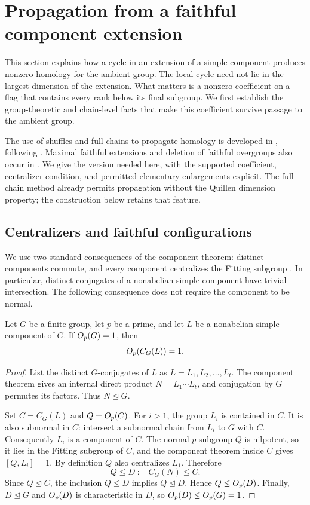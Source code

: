 \section{Propagation from a faithful component extension}
\label{sec:propagation}

This section explains how a cycle in an extension of a simple component
produces nonzero homology for the ambient group.  The local cycle need not
lie in the largest dimension of the extension.  What matters is a nonzero
coefficient on a flag that contains every rank below its final subgroup.
We first establish the group-theoretic and chain-level facts that make
this coefficient survive passage to the ambient group.

The use of shuffles and full chains to propagate homology is developed
in \citet[Section~3, Lemmas~3.12--3.14]{Piterman2021}, following
\citet[Lemmas~0.24, 0.25, and~0.27]{AschbacherSmith1993}.
Maximal faithful extensions and deletion of faithful overgroups also
occur in \citet[Section~4, proof of Theorem~1, and Section~5]{Piterman2021}.
We give the version needed here, with the supported coefficient,
centralizer condition, and permitted elementary enlargements explicit.
The full-chain method already permits propagation without the Quillen
dimension property; the construction below retains that feature.

\subsection{Centralizers and faithful configurations}

We use two standard consequences of the component theorem: distinct
components commute, and every component centralizes the Fitting subgroup
\cite{GLS1998}.  In particular, distinct conjugates of a nonabelian simple
component have trivial intersection.  The following consequence does not
require the component to be normal.

\begin{lemma}\label{lem:component-core}
Let $G$ be a finite group, let $p$ be a prime, and let $L$ be a nonabelian
simple component of $G$.  If $O_p(G)=1$, then
\[
  O_p(C_G(L))=1.
\]
\end{lemma}

\begin{proof}
List the distinct $G$-conjugates of $L$ as $L=L_1,L_2,\ldots,L_t$.
The component theorem gives an internal direct product
$N=L_1\cdots L_t$, and conjugation by $G$ permutes its factors.  Thus
$N\trianglelefteq G$.

Set $C=C_G(L)$ and $Q=O_p(C)$.  For $i>1$, the group $L_i$ is contained
in $C$.  It is also subnormal in $C$: intersect a subnormal chain from
$L_i$ to $G$ with $C$.  Consequently $L_i$ is a component of $C$.
The normal $p$-subgroup $Q$ is nilpotent, so it lies in the Fitting
subgroup of $C$, and the component theorem inside $C$ gives
$[Q,L_i]=1$.  By definition $Q$ also centralizes $L_1$.  Therefore
\[
 Q\le D:=C_G(N)\le C.
\]
Since $Q\trianglelefteq C$, the inclusion $Q\le D$ implies
$Q\trianglelefteq D$.  Hence $Q\le O_p(D)$.  Finally,
$D\trianglelefteq G$ and $O_p(D)$ is characteristic in $D$, so
$O_p(D)\le O_p(G)=1$.
\end{proof}

